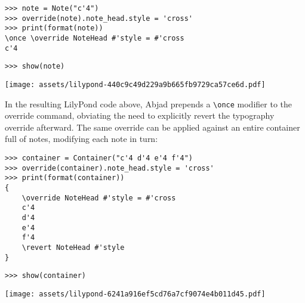 \begin{comment}
<abjad>
note = Note("c'4")
override(note).note_head.style = 'cross'
print(format(note))
show(note)
</abjad>
\end{comment}

\begin{abjadbookoutput}
\begin{singlespacing}
\vspace{-0.5\baselineskip}
\begin{verbatim}
>>> note = Note("c'4")
>>> override(note).note_head.style = 'cross'
>>> print(format(note))
\once \override NoteHead #'style = #'cross
c'4
\end{verbatim}
\begin{verbatim}
>>> show(note)
\end{verbatim}
\noindent\texttt{[image: assets/lilypond-440c9c49d229a9b665fb9729ca57ce6d.pdf]}
\end{singlespacing}
\end{abjadbookoutput}

\noindent In the resulting LilyPond code above, Abjad prepends a
\texttt{\textbackslash{}once} modifier to the override command, obviating the
need to explicitly revert the typography override afterward. The same override
can be applied against an entire container full of notes, modifying each note
in turn:

\begin{comment}
<abjad>
container = Container("c'4 d'4 e'4 f'4")
override(container).note_head.style = 'cross'
print(format(container))
show(container)
</abjad>
\end{comment}

\begin{abjadbookoutput}
\begin{singlespacing}
\vspace{-0.5\baselineskip}
\begin{verbatim}
>>> container = Container("c'4 d'4 e'4 f'4")
>>> override(container).note_head.style = 'cross'
>>> print(format(container))
{
    \override NoteHead #'style = #'cross
    c'4
    d'4
    e'4
    f'4
    \revert NoteHead #'style
}
\end{verbatim}
\begin{verbatim}
>>> show(container)
\end{verbatim}
\noindent\texttt{[image: assets/lilypond-6241a916ef5cd76a7cf9074e4b011d45.pdf]}
\end{singlespacing}
\end{abjadbookoutput}

